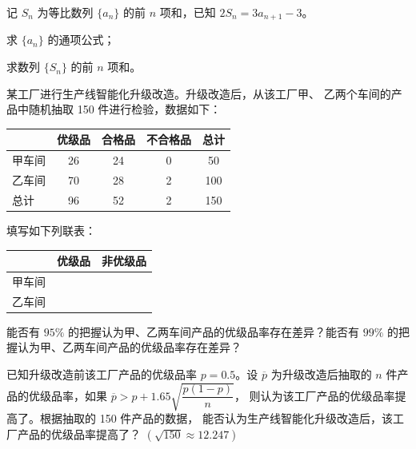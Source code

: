 \documentclass[UTF8,12pt]{ctexart}
\begin{document}
\begin{questions}[start=17]

  \item 记 $S_{n}$ 为等比数列 $\{a_{n}\}$ 的前 $n$ 项和，已知 $2S_{n}=3a_{n+1}-3$。
    \begin{subquestions}
      \item 求 $\{a_{n}\}$ 的通项公式；
      \item 求数列 $\{S_{n}\}$ 的前 $n$ 项和。
    \end{subquestions}

  \item 某工厂进行生产线智能化升级改造。升级改造后，从该工厂甲、
    乙两个车间的产品中随机抽取 150 件进行检验，数据如下：

    \begin{center}
      \begin{tabular}{lcccc}
        \toprule
               & 优级品 & 合格品 & 不合格品 & 总计 \\
        \midrule
        甲车间 & 26     & 24     & 0        & 50 \\
        乙车间 & 70     & 28     & 2        & 100 \\
        \midrule
        总计   & 96     & 52     & 2        & 150 \\
        \bottomrule
      \end{tabular}
    \end{center}

    \begin{subquestions}
      \item 填写如下列联表：

        \begin{center}
          \begin{tabular}{lcc}
            \toprule
                   & 优级品       & 非优级品 \\
            \midrule
            甲车间 & \hspace{3em} & \hspace{3em} \\
            乙车间 &              &  \\
            \bottomrule
          \end{tabular}
        \end{center}

        能否有 $95\%$ 的把握认为甲、乙两车间产品的优级品率存在差异？能否有 $99\%$
          的把握认为甲、乙两车间产品的优级品率存在差异？
      \item 已知升级改造前该工厂产品的优级品率 $p = 0.5$。设 $\overline{p}$
        为升级改造后抽取的 $n$ 件产品的优级品率，如果
        $\overline{p} > p + 1.65\sqrt{\dfrac{p(1 - p)}{n}}$，
        则认为该工厂产品的优级品率提高了。根据抽取的 150 件产品的数据，
        能否认为生产线智能化升级改造后，该工厂产品的优级品率提高了？%
        $(\sqrt{150} \approx 12.247)$
    \end{subquestions}


\end{questions}
\end{document}
